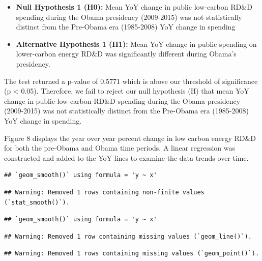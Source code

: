 \documentclass[
  12pt,
]{article}
\begin{document}
\begin{itemize}
\item
  \textbf{Null Hypothesis 1 (H0):} Mean YoY change in public low-carbon
  RD\&D spending during the Obama presidency (2009-2015) was not
  statistically distinct from the Pre-Obama era (1985-2008) YoY change
  in spending
\item
  \textbf{Alternative Hypothesis 1 (H1):} Mean YoY change in public
  spending on lower-carbon energy RD\&D was significantly different
  during Obama's presidency.
\end{itemize}

The test returned a p-value of 0.5771 which is above our threshold of
significance (p \textless{} 0.05). Therefore, we fail to reject our null
hypothesis (H) that mean YoY change in public low-carbon RD\&D spending
during the Obama presidency (2009-2015) was not statistically distinct
from the Pre-Obama era (1985-2008) YoY change in spending.

Figure 8 displays the year over year percent change in low carbon energy
RD\&D for both the pre-Obama and Obama time periods. A linear regression
was constructed and added to the YoY lines to examine the data trends
over time.

\newpage

\begin{verbatim}
## `geom_smooth()` using formula = 'y ~ x'
\end{verbatim}

\begin{verbatim}
## Warning: Removed 1 rows containing non-finite values (`stat_smooth()`).
\end{verbatim}

\begin{verbatim}
## `geom_smooth()` using formula = 'y ~ x'
\end{verbatim}

\begin{verbatim}
## Warning: Removed 1 row containing missing values (`geom_line()`).
\end{verbatim}

\begin{verbatim}
## Warning: Removed 1 rows containing missing values (`geom_point()`).
\end{verbatim}
\end{document}
